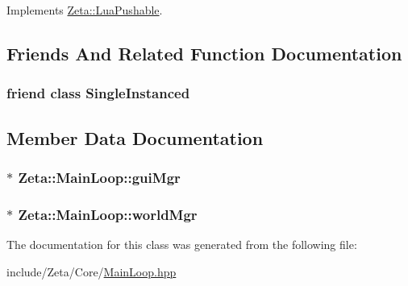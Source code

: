 Implements \hyperlink{classZeta_1_1LuaPushable_a0380ec9cff11f749e8eb67b51b8f82fc}{Zeta\+::\+Lua\+Pushable}.



\subsection{Friends And Related Function Documentation}
\hypertarget{classZeta_1_1MainLoop_a2fa95d69b32a77fffa4b730679a8b08c}{
\subsubsection[{Single\+Instanced}]{\setlength{\rightskip}{0pt plus 5cm}friend class {\bf Single\+Instanced}\hspace{0.3cm}{\ttfamily [friend]}}}\label{classZeta_1_1MainLoop_a2fa95d69b32a77fffa4b730679a8b08c}


\subsection{Member Data Documentation}
\hypertarget{classZeta_1_1MainLoop_a64ee8d94a5b467c5b25bfc77268e268e}{
\subsubsection[{gui\+Mgr}]{$\ast$ Zeta\+::\+Main\+Loop\+::gui\+Mgr\hspace{0.3cm}{\ttfamily [private]}}}\label{classZeta_1_1MainLoop_a64ee8d94a5b467c5b25bfc77268e268e}
\hypertarget{classZeta_1_1MainLoop_aa971c465639f0d7c7a8499706d002004}{
\subsubsection[{world\+Mgr}]{$\ast$ Zeta\+::\+Main\+Loop\+::world\+Mgr\hspace{0.3cm}{\ttfamily [private]}}}\label{classZeta_1_1MainLoop_aa971c465639f0d7c7a8499706d002004}


The documentation for this class was generated from the following file\+:\begin{DoxyCompactItemize}
\item 
include/\+Zeta/\+Core/\hyperlink{MainLoop_8hpp}{Main\+Loop.\+hpp}\end{DoxyCompactItemize}
